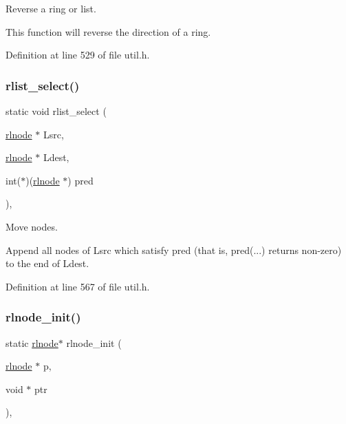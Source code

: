 Reverse a ring or list. 

This function will reverse the direction of a ring. 

Definition at line 529 of file util.\+h.

\mbox{\label{group__rlists_ga6016cbc055d242a03d823ebfec422c2b}} 
\subsubsection{\texorpdfstring{rlist\+\_\+select()}{rlist\_select()}}
{\footnotesize\ttfamily static void rlist\+\_\+select (\begin{DoxyParamCaption}\item[{\hyperlink{group__rlists_ga8f6244877f7ce2322c90525217ea6e7a}{rlnode} $\ast$}]{Lsrc,  }\item[{\hyperlink{group__rlists_ga8f6244877f7ce2322c90525217ea6e7a}{rlnode} $\ast$}]{Ldest,  }\item[{int($\ast$)(\hyperlink{group__rlists_ga8f6244877f7ce2322c90525217ea6e7a}{rlnode} $\ast$)}]{pred }\end{DoxyParamCaption})\hspace{0.3cm}{\ttfamily [inline]}, {\ttfamily [static]}}



Move nodes. 

Append all nodes of Lsrc which satisfy pred (that is, pred(...) returns non-\/zero) to the end of Ldest. 

Definition at line 567 of file util.\+h.

\mbox{\label{group__rlists_ga578e6dc256d4f1580bd8500edf374aca}} 
\subsubsection{\texorpdfstring{rlnode\+\_\+init()}{rlnode\_init()}}
{\footnotesize\ttfamily static \hyperlink{group__rlists_ga8f6244877f7ce2322c90525217ea6e7a}{rlnode}$\ast$ rlnode\+\_\+init (\begin{DoxyParamCaption}\item[{\hyperlink{group__rlists_ga8f6244877f7ce2322c90525217ea6e7a}{rlnode} $\ast$}]{p,  }\item[{void $\ast$}]{ptr }\end{DoxyParamCaption})\hspace{0.3cm}{\ttfamily [inline]}, {\ttfamily [static]}}



